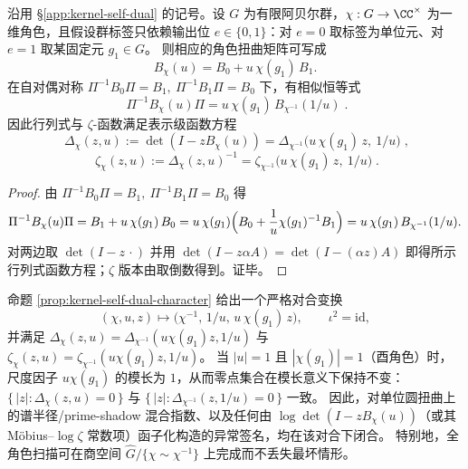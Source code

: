 \begin{proposition}\label{prop:kernel-self-dual-character}
沿用 \S\ref{app:kernel-self-dual} 的记号。设 \(G\) 为有限阿贝尔群，\(\chi:G\to\CC^\times\) 为一维角色，且假设群标签只依赖输出位 \(e\in\{0,1\}\)：对 \(e=0\) 取标签为单位元、对 \(e=1\) 取某固定元 \(g_1\in G\)。
则相应的角色扭曲矩阵可写成
\[
B_\chi(u)=B_0+u\,\chi(g_1)\,B_1.
\]
在自对偶对称 \(\Pi^{-1}B_0\Pi=B_1,\ \Pi^{-1}B_1\Pi=B_0\) 下，有相似恒等式
\[
\boxed{\;
\Pi^{-1}B_\chi(u)\Pi
=u\,\chi(g_1)\,B_{\chi^{-1}}(1/u)\; }.
\]
因此行列式与 \(\zeta\)-函数满足表示级函数方程
\[
\boxed{\;
\Delta_\chi(z,u):=\det(I-zB_\chi(u))
=\Delta_{\chi^{-1}}\!\bigl(u\,\chi(g_1)\,z,\ 1/u\bigr)\; },
\]
\[
\boxed{\;
\zeta_\chi(z,u):=\Delta_\chi(z,u)^{-1}
=\zeta_{\chi^{-1}}\!\bigl(u\,\chi(g_1)\,z,\ 1/u\bigr)\; }.
\]
\end{proposition}
\begin{proof}
由 \(\Pi^{-1}B_0\Pi=B_1,\ \Pi^{-1}B_1\Pi=B_0\) 得
\[
\Pi^{-1}B_\chi(u)\Pi
=B_1+u\,\chi(g_1)\,B_0
=u\,\chi(g_1)\Bigl(B_0+\frac{1}{u}\chi(g_1)^{-1}B_1\Bigr)
=u\,\chi(g_1)\,B_{\chi^{-1}}(1/u).
\]
对两边取 \(\det(I-z\,\cdot)\) 并用 \(\det(I-z\alpha A)=\det(I-(\alpha z)A)\) 即得所示行列式函数方程；\(\zeta\) 版本由取倒数得到。证毕。
\end{proof}

\begin{remark}\label{rem:kernel-self-dual-character-dihedral}
命题 \ref{prop:kernel-self-dual-character} 给出一个严格对合变换
\[
(\chi,u,z)\longmapsto\bigl(\chi^{-1},\,1/u,\,u\,\chi(g_1)\,z\bigr),
\qquad \iota^2=\mathrm{id},
\]
并满足 \(\Delta_\chi(z,u)=\Delta_{\chi^{-1}}(u\chi(g_1)z,1/u)\) 与 \(\zeta_\chi(z,u)=\zeta_{\chi^{-1}}(u\chi(g_1)z,1/u)\)。
当 \(|u|=1\) 且 \(|\chi(g_1)|=1\)（酉角色）时，尺度因子 \(u\chi(g_1)\) 的模长为 \(1\)，从而零点集合在模长意义下保持不变：\(\{\,|z|:\Delta_\chi(z,u)=0\,\}\) 与 \(\{\,|z|:\Delta_{\chi^{-1}}(z,1/u)=0\,\}\) 一致。
因此，对单位圆扭曲上的谱半径/prime-shadow 混合指数、以及任何由 \(\log\det(I-zB_\chi(u))\)（或其 Möbius--\(\log\zeta\) 常数项）函子化构造的异常签名，均在该对合下闭合。
特别地，全角色扫描可在商空间 \(\widehat G/\{\chi\sim\chi^{-1}\}\) 上完成而不丢失最坏情形。
\end{remark}

